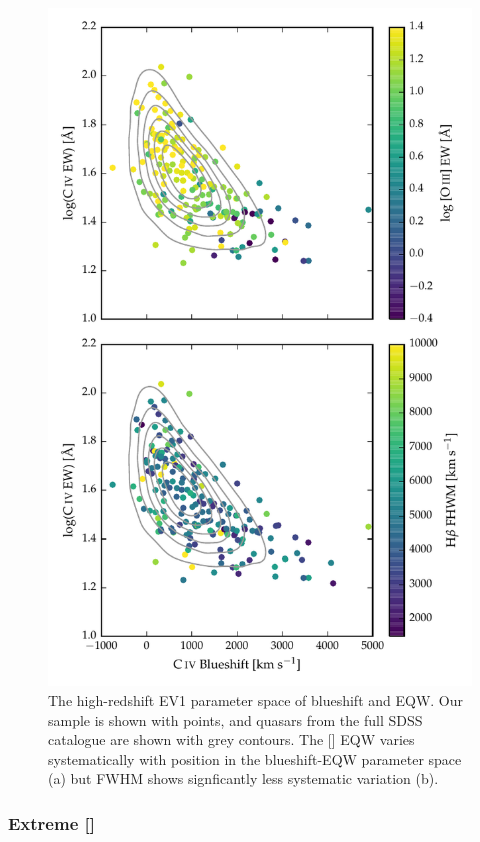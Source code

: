 \begin{figure}
    \includegraphics[width=\columnwidth]{figures/chapter04/ev1.pdf} 
    \caption{The high-redshift \ac{EV1} parameter space of  blueshift and \ac{EQW}. Our sample is shown with points, and quasars from the full \ac{SDSS} catalogue are shown with grey contours. The [] EQW varies systematically with position in the  blueshift-\ac{EQW} parameter space (a) but \hb FWHM shows signficantly less systematic variation (b).}      
    \label{fig:ev1}
\end{figure}

\subsubsection{Extreme []}

